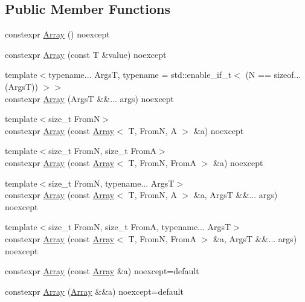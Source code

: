 \subsection*{Public Member Functions}
\begin{DoxyCompactItemize}
\item 
constexpr \mbox{\hyperlink{structmage_1_1_array_ac1cf5733c005dfb79fb9e5e736098598}{Array}} () noexcept
\item 
constexpr \mbox{\hyperlink{structmage_1_1_array_a1f206f942c1318eb7f57c7e0666bc923}{Array}} (const T \&value) noexcept
\item 
{\footnotesize template$<$typename... ArgsT, typename  = std\+::enable\+\_\+if\+\_\+t$<$ (\+N == sizeof...(\+Args\+T)) $>$$>$ }\\constexpr \mbox{\hyperlink{structmage_1_1_array_ab6dbce28b41b7ef1e9c0195f24f378a6}{Array}} (ArgsT \&\&... args) noexcept
\item 
{\footnotesize template$<$size\+\_\+t FromN$>$ }\\constexpr \mbox{\hyperlink{structmage_1_1_array_a1e0a4b5cebb34709b32bc13e9ab917e1}{Array}} (const \mbox{\hyperlink{structmage_1_1_array}{Array}}$<$ T, FromN, A $>$ \&a) noexcept
\item 
{\footnotesize template$<$size\+\_\+t FromN, size\+\_\+t FromA$>$ }\\constexpr \mbox{\hyperlink{structmage_1_1_array_ac747c6b1fad2e919e3370cbe6b2937f5}{Array}} (const \mbox{\hyperlink{structmage_1_1_array}{Array}}$<$ T, FromN, FromA $>$ \&a) noexcept
\item 
{\footnotesize template$<$size\+\_\+t FromN, typename... ArgsT$>$ }\\constexpr \mbox{\hyperlink{structmage_1_1_array_a128de416259f75f7b4ab8ab2e1ba9bd7}{Array}} (const \mbox{\hyperlink{structmage_1_1_array}{Array}}$<$ T, FromN, A $>$ \&a, ArgsT \&\&... args) noexcept
\item 
{\footnotesize template$<$size\+\_\+t FromN, size\+\_\+t FromA, typename... ArgsT$>$ }\\constexpr \mbox{\hyperlink{structmage_1_1_array_a4952f767cdedb8c2874391dc4d9b74c3}{Array}} (const \mbox{\hyperlink{structmage_1_1_array}{Array}}$<$ T, FromN, FromA $>$ \&a, ArgsT \&\&... args) noexcept
\item 
constexpr \mbox{\hyperlink{structmage_1_1_array_a8dc58948e15554f715b280a72140a1f4}{Array}} (const \mbox{\hyperlink{structmage_1_1_array}{Array}} \&a) noexcept=default
\item 
constexpr \mbox{\hyperlink{structmage_1_1_array_a4cf0fb395b42d53b6e59868739dc9613}{Array}} (\mbox{\hyperlink{structmage_1_1_array}{Array}} \&\&a) noexcept=default

\end{DoxyCompactItemize}
